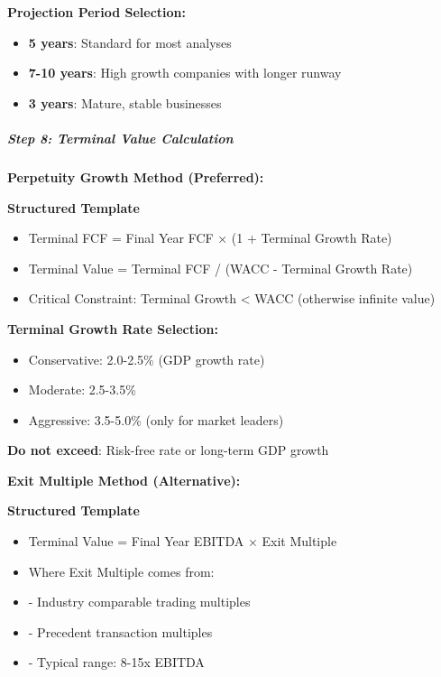 \documentclass[11pt]{article}
\begin{document}
\textbf{Projection Period Selection:}

\begin{itemize}[leftmargin=*,itemsep=2pt,topsep=2pt]
\item {} \textbf{5 years}: Standard for most analyses
\item {} \textbf{7-10 years}: High growth companies with longer runway
\item {} \textbf{3 years}: Mature, stable businesses
\end{itemize}

\subparagraph{Step 8: Terminal Value Calculation}\mbox{}\par

\textbf{Perpetuity Growth Method (Preferred):}


\textbf{Structured Template}
\begin{itemize}[leftmargin=*,itemsep=2pt,topsep=2pt]
\item {} Terminal FCF = Final Year FCF × (1 + Terminal Growth Rate)
\item {} Terminal Value = Terminal FCF / (WACC - Terminal Growth Rate)
\item {} Critical Constraint: Terminal Growth < WACC (otherwise infinite value)
\end{itemize}

\textbf{Terminal Growth Rate Selection:}

\begin{itemize}[leftmargin=*,itemsep=2pt,topsep=2pt]
\item {} Conservative: 2.0-2.5\% (GDP growth rate)
\item {} Moderate: 2.5-3.5\%
\item {} Aggressive: 3.5-5.0\% (only for market leaders)
\end{itemize}

\textbf{Do not exceed}: Risk-free rate or long-term GDP growth


\textbf{Exit Multiple Method (Alternative):}

\textbf{Structured Template}
\begin{itemize}[leftmargin=*,itemsep=2pt,topsep=2pt]
\item {} Terminal Value = Final Year EBITDA × Exit Multiple
\item {} Where Exit Multiple comes from:
\item {} - Industry comparable trading multiples
\item {} - Precedent transaction multiples
\item {} - Typical range: 8-15x EBITDA
\end{itemize}
\end{document}
